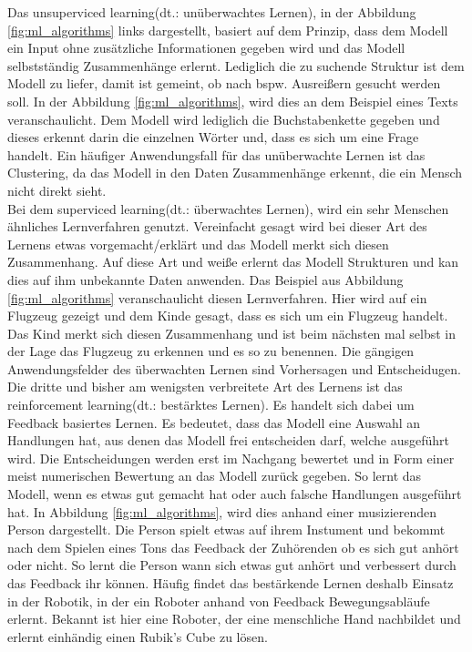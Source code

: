 \begin{onehalfspace}
        Das \glqq{}unsuperviced learning\grqq{}(\ac*{dt}.: unüberwachtes Lernen), in der Abbildung \ref*{fig:ml_algorithms} links dargestellt, basiert auf dem Prinzip, dass dem Modell ein Input ohne zusätzliche Informationen gegeben wird und das Modell selbstständig Zusammenhänge erlernt. Lediglich die zu suchende Struktur ist dem Modell zu liefer, damit ist gemeint, ob nach bspw. Ausreißern gesucht werden soll. In der Abbildung  \ref*{fig:ml_algorithms}, wird dies an dem Beispiel eines Texts veranschaulicht. Dem Modell wird lediglich die Buchstabenkette gegeben und dieses erkennt darin die einzelnen Wörter und, dass es sich um eine Frage handelt. Ein häufiger Anwendungsfall für das unüberwachte Lernen ist das Clustering, da das Modell in den Daten Zusammenhänge erkennt, die ein Mensch nicht direkt sieht.\cite{Datenkommission2019}\cite{Döbel2018} \\
        Bei dem \glqq{}superviced learning\grqq{}(\ac*{dt}.: überwachtes Lernen), wird ein sehr Menschen ähnliches Lernverfahren genutzt. Vereinfacht gesagt wird bei dieser Art des Lernens etwas vorgemacht/erklärt und das Modell merkt sich diesen Zusammenhang. Auf diese Art und weiße erlernt das Modell Strukturen und kan dies auf ihm unbekannte Daten anwenden. Das Beispiel aus Abbildung \ref*{fig:ml_algorithms} veranschaulicht diesen Lernverfahren. Hier wird auf ein Flugzeug gezeigt und dem Kinde gesagt, dass es sich um ein Flugzeug handelt. Das Kind merkt sich diesen Zusammenhang und ist beim nächsten mal selbst in der Lage das Flugzeug zu erkennen und es so zu benennen. Die gängigen Anwendungsfelder des überwachten Lernen sind Vorhersagen und Entscheidugen.\cite{Döbel2018} \\
        Die dritte und bisher am wenigsten verbreitete Art des Lernens ist das \glqq{}reinforcement learning\grqq{}(\ac*{dt}.: bestärktes Lernen). Es handelt sich dabei um Feedback basiertes Lernen. Es bedeutet, dass das Modell eine Auswahl an Handlungen hat, aus denen das Modell frei entscheiden darf, welche ausgeführt wird. Die Entscheidungen werden erst im Nachgang bewertet und in Form einer meist numerischen Bewertung an das Modell zurück gegeben. So lernt das Modell, wenn es etwas gut gemacht hat oder auch falsche Handlungen ausgeführt hat. In Abbildung \ref*{fig:ml_algorithms}, wird dies anhand einer musizierenden Person dargestellt. Die Person spielt etwas auf ihrem Instument und bekommt nach dem Spielen eines Tons das Feedback der Zuhörenden ob es sich gut anhört oder nicht. So lernt die Person wann sich etwas gut anhört und verbessert durch das Feedback ihr können. Häufig findet das bestärkende Lernen deshalb Einsatz in der Robotik, in der ein Roboter anhand von Feedback Bewegungsabläufe erlernt. Bekannt ist hier eine Roboter, der eine menschliche Hand nachbildet und erlernt einhändig einen Rubik’s Cube zu lösen.\cite{Horn2022}\cite{Döbel2018}\cite{Rubik2019}

\end{onehalfspace}
